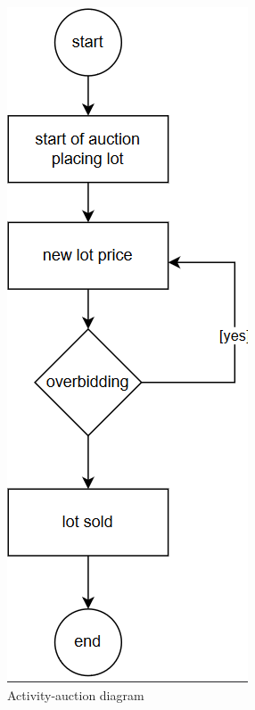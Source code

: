 \begin{figure}[h!]
    \centering
    \includegraphics[scale=0.6]{figures/activity-auction.png}
    \caption{Activity-auction diagram}
    \label{fig:activity-auction}
\end{figure}

